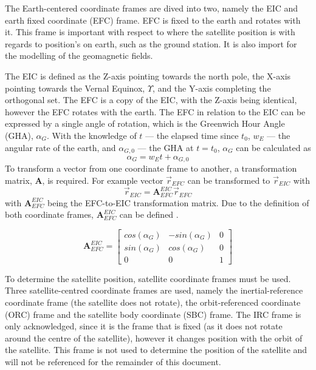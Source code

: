 The Earth-centered coordinate frames are dived into two, namely the EIC and earth fixed coordinate (EFC) frame. EFC is fixed to the earth and rotates with it. This frame is important with respect to where the satellite position is with regards to position's on earth, such as the ground station. It is also import for the modelling of the geomagnetic fields. 


The EIC is defined as the Z-axis pointing towards the north pole, the X-axis pointing towards the Vernal Equinox, $\Upsilon$, and the Y-axis completing the orthogonal set. The EFC is a copy of the EIC, with the Z-axis being identical, however the EFC rotates with the earth. The EFC in relation to the EIC can be expressed by a single angle of rotation, which is the Greenwich Hour Angle (GHA), $\alpha_G$. With the knowledge of $t$ --- the elapsed time since $t_0$, $w_E$ --- the angular rate of the earth, and $\alpha_{G,0}$ --- the GHA at $t = t_0$, $\alpha_G$ can be calculated as 
\begin{equation}
\alpha_G = w_Et + \alpha_{G,0}
\end{equation}
To transform a vector from one coordinate frame to another, a transformation matrix, $\boldsymbol{A}$, is required. For example vector $\overrightarrow{r}_{EFC}$ can be transformed to $\overrightarrow{r}_{EIC}$ with 
\begin{equation}
\overrightarrow{r}_{EIC} = \boldsymbol{A}^{EIC}_{EFC}\overrightarrow{r}_{EFC}
\end{equation}
with $\boldsymbol{A}^{EIC}_{EFC}$ being the EFC-to-EIC transformation matrix. Due to the definition of both coordinate frames, $\boldsymbol{A}^{EIC}_{EFC}$ can be defined .

\begin{equation}
\boldsymbol{A}^{EIC}_{EFC} = 
\begin{bmatrix}
	cos(\alpha_G) & -sin(\alpha_G) & 0\\
	sin(\alpha_G) & cos(\alpha_G) & 0 \\
	0 & 0 & 1
\end{bmatrix}
\end{equation}

To determine the satellite position, satellite coordinate frames must be used. Three satellite-centred coordinate frames are used, namely the inertial-reference coordinate frame (the satellite does not rotate), the orbit-referenced coordinate (ORC) frame and the satellite body coordinate (SBC) frame. The IRC frame is only acknowledged, since it is the frame that is fixed (as it does not rotate around the centre of the satellite), however it changes position with the orbit of the satellite. This frame is not used to determine the position of the satellite and will not be referenced for the remainder of this document.

